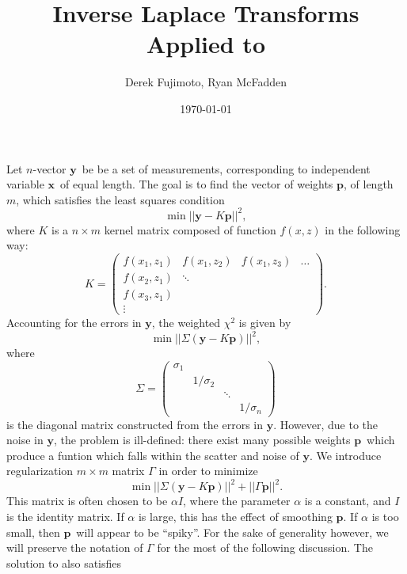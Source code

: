 \documentclass{article}
\title{Inverse Laplace Transforms Applied to \bnmr}
\author{Derek Fujimoto, Ryan McFadden}
\date{\today}
\newcommand{\y}{\ensuremath{\bm{y}}}
\newcommand{\p}{\ensuremath{\bm{p}}}
\newcommand{\x}{\ensuremath{\bm{x}}}
\begin{document}
\maketitle

Let $n$-vector \y\ be be a set of measurements, corresponding to independent variable \x\ of equal length. The goal is to find the vector of weights \p, of length $m$, which satisfies the least squares condition
%
\begin{equation}
\min ||\y-K\p||^2,
\end{equation}
%
where $K$ is a $n\times m$ kernel matrix composed of function $f(x,z)$ in the following way:
%
\begin{equation}\label{eq:K}
K = \left(
	\begin{array}{cccc}
	f(x_1,z_1) & f(x_1,z_2) & f(x_1,z_3) & \hdots \\
	f(x_2,z_1) & \ddots & & \\
	f(x_3,z_1) & & &  \\
	\vdots
	\end{array}
\right).
\end{equation}
%
Accounting for the errors in \y, the weighted $\chi^2$ is given by 
%
\begin{equation}
\min ||\Sigma(\y-K\p)||^2,
\end{equation}
%
where
%
\begin{equation}
\Sigma = \left(
	\begin{array}{cccc}
	\sigma_1 & & & \\
	& 1/\sigma_2 &&\\
	&& \ddots &\\
	&&& 1/\sigma_n
	\end{array}
\right)
\end{equation}
%
is the diagonal matrix constructed from the errors in \y. However, due to the noise in \y, the problem is ill-defined: there exist many possible weights \p\ which produce a funtion which falls within the scatter and noise of \y. We introduce regularization $m\times m$ matrix $\Gamma$ in order to minimize 
%
\begin{equation}\label{eq:min2}
\min ||\Sigma(\y-K\p)||^2 + ||\Gamma\p||^2.
\end{equation}
%
This matrix is often chosen to be $\alpha I$, where the parameter $\alpha$ is a constant, and $I$ is the identity matrix. If $\alpha$ is large, this has the effect of smoothing \p. If $\alpha$ is too small, then \p\ will appear to be ``spiky''. For the sake of generality however, we will preserve the notation of $\Gamma$ for the most of the following discussion. The solution to  also satisfies 
\end{document}
